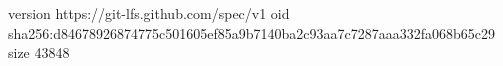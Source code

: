 version https://git-lfs.github.com/spec/v1
oid sha256:d84678926874775c501605ef85a9b7140ba2c93aa7c7287aaa332fa068b65c29
size 43848
